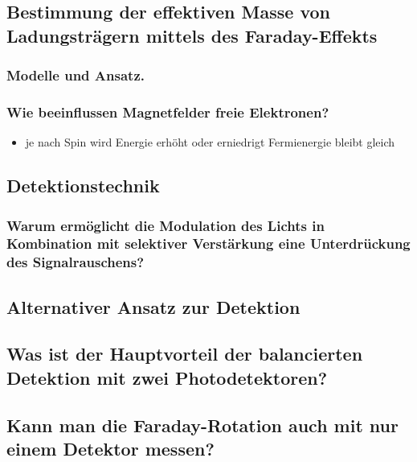 \subsection{Bestimmung der effektiven Masse von Ladungsträgern mittels des Faraday-Effekts}
\subsubsection*{Modelle und Ansatz.}
\subsubsection*{Wie beeinflussen Magnetfelder freie Elektronen?}
\begin{itemize}
    \item je nach Spin wird Energie erhöht oder erniedrigt
        \to Fermienergie bleibt gleich
        \iff 
\end{itemize}

\subsection{Detektionstechnik}
\subsubsection*{Warum ermöglicht die Modulation des Lichts in Kombination mit selektiver Verstärkung eine Unterdrückung des Signalrauschens?}

\subsection{Alternativer Ansatz zur Detektion} 
\subsection*{Was ist der Hauptvorteil der balancierten Detektion mit zwei Photodetektoren?}
\subsection*{Kann man die Faraday-Rotation auch mit nur einem Detektor messen?}
